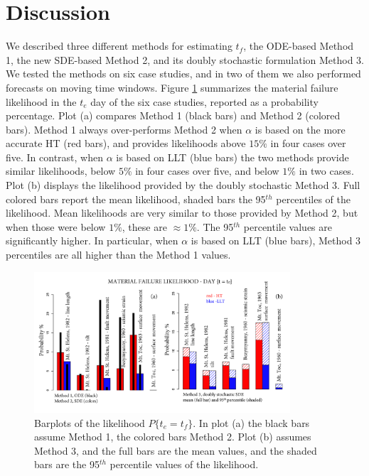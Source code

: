\documentclass{article}
\begin{document}
\section{Discussion}
We described three different methods for estimating $t_f$, the ODE-based Method 1, the new SDE-based Method 2, and its doubly stochastic formulation Method 3. We tested the methods on six case studies, and in two of them we also performed forecasts on moving time windows. Figure \ref{Fig15} summarizes the material failure likelihood in the $t_e$ day of the six case studies, reported as a probability percentage. Plot (a) compares Method 1 (black bars) and Method 2 (colored bars). Method 1 always over-performs Method 2 when $\alpha$ is based on the more accurate HT (red bars), and provides likelihoods above $15\%$ in four cases over five. In contrast, when $\alpha$ is based on LLT (blue bars) the two methods provide similar likelihoods, below $5\%$ in four cases over five, and below $1\%$ in two cases. Plot (b) displays the likelihood provided by the doubly stochastic Method 3. Full colored bars report the mean likelihood, shaded bars the 95$^{th}$ percentiles of the likelihood. Mean likelihoods are very similar to those provided by Method 2, but when those were below $1\%$, these are $\approx 1\%$. The 95$^{th}$ percentile values are significantly higher. In particular, when $\alpha$ is based on LLT (blue bars), Method 3 percentiles are all higher than the Method 1 values.

\begin{figure}[H]
\centering
\includegraphics[width=0.85\textwidth]{Fig15_plus.png}
\caption{Barplots of the likelihood $P\{t_e=t_f\}$. In plot (a) the black bars assume Method 1, the colored bars Method 2. Plot (b) assumes Method 3, and the full bars are the mean values, and the shaded bars are the 95$^{th}$ percentile values of the likelihood.}
\label{Fig15}
\end{figure}
\end{document}
